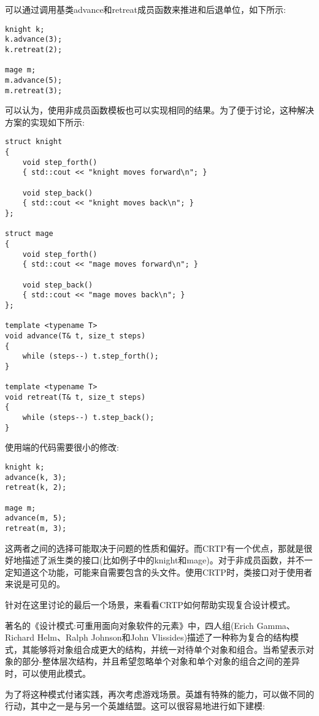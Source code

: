 可以通过调用基类advance和retreat成员函数来推进和后退单位，如下所示:

\begin{lstlisting}[style=styleCXX]
knight k;
k.advance(3);
k.retreat(2);

mage m;
m.advance(5);
m.retreat(3);
\end{lstlisting}

可以认为，使用非成员函数模板也可以实现相同的结果。为了便于讨论，这种解决方案的实现如下所示:

\begin{lstlisting}[style=styleCXX]
struct knight
{
	void step_forth()
	{ std::cout << "knight moves forward\n"; }

	void step_back()
	{ std::cout << "knight moves back\n"; }
};

struct mage
{
	void step_forth()
	{ std::cout << "mage moves forward\n"; }

	void step_back()
	{ std::cout << "mage moves back\n"; }
};

template <typename T>
void advance(T& t, size_t steps)
{
	while (steps--) t.step_forth();
}

template <typename T>
void retreat(T& t, size_t steps)
{
	while (steps--) t.step_back();
}
\end{lstlisting}

使用端的代码需要很小的修改:

\begin{lstlisting}[style=styleCXX]
knight k;
advance(k, 3);
retreat(k, 2);

mage m;
advance(m, 5);
retreat(m, 3);
\end{lstlisting}

这两者之间的选择可能取决于问题的性质和偏好。而CRTP有一个优点，那就是很好地描述了派生类的接口(比如例子中的knight和mage)。对于非成员函数，并不一定知道这个功能，可能来自需要包含的头文件。使用CRTP时，类接口对于使用者来说是可见的。

针对在这里讨论的最后一个场景，来看看CRTP如何帮助实现复合设计模式。


著名的《设计模式:可重用面向对象软件的元素》中，四人组(Erich Gamma、Richard Helm、Ralph Johnson和John Vlissides)描述了一种称为复合的结构模式，其能够将对象组合成更大的结构，并统一对待单个对象和组合。当希望表示对象的部分-整体层次结构，并且希望忽略单个对象和单个对象的组合之间的差异时，可以使用此模式。

为了将这种模式付诸实践，再次考虑游戏场景。英雄有特殊的能力，可以做不同的行动，其中之一是与另一个英雄结盟。这可以很容易地进行如下建模:

